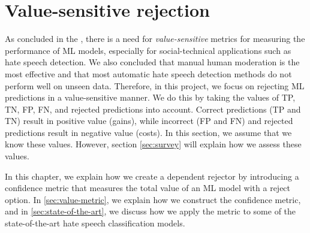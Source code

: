 \chapter{Value-sensitive rejection}
As concluded in the , there is a need for \textit{value-sensitive} metrics for measuring the performance of ML models, especially for social-technical applications such as hate speech detection.
%
We also concluded that manual human moderation is the most effective and that most automatic hate speech detection methods do not perform well on unseen data.
%
Therefore, in this project, we focus on rejecting ML predictions in a value-sensitive manner.
%
We do this by taking the values of TP, TN, FP, FN, and rejected predictions into account.
%
Correct predictions (TP and TN) result in positive value (gains), while incorrect (FP and FN) and rejected predictions result in negative value (costs).
%
In this section, we assume that we know these values.
%
However, section \ref{sec:survey} will explain how we assess these values.
%

%
In this chapter, we explain how we create a dependent rejector by introducing a confidence metric that measures the total value of an ML model with a reject option. In \ref{sec:value-metric}, we explain how we construct the confidence metric, and in \ref{sec:state-of-the-art}, we discuss how we apply the metric to some of the state-of-the-art hate speech classification models.

